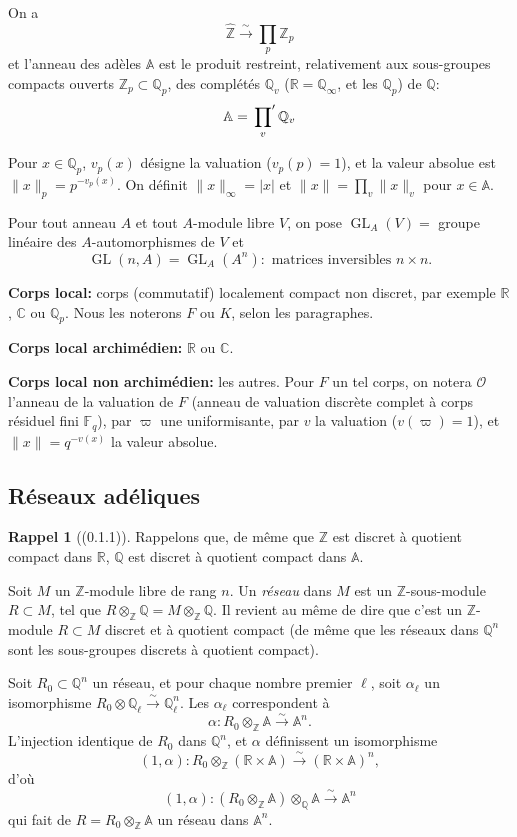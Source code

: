 \documentclass[11pt,a4paper]{amsart}
\theoremstyle{plain}
\theoremstyle{definition}
\newtheorem{rappel}[theorem]{Rappel}
\theoremstyle{remark}
\DeclareMathOperator{\GL}{GL}
\newcommand{\ZZ}{\mathbb{Z}}
\newcommand{\QQ}{\mathbb{Q}}
\newcommand{\RR}{\mathbb{R}}
\newcommand{\CC}{\mathbb{C}}
\newcommand{\Af}{\mathbb{A}}
\newcommand{\Fq}{\mathbb{F}_q}
\newcommand{\cO}{\mathcal{O}}
\newcommand{\wh}{\widehat}
\begin{document}
On a
\[ \wh{\ZZ} \xrightarrow{\sim} \prod_p \ZZ_p \]
et l'anneau des ad\`eles $\Af$ est le produit restreint, relativement aux sous-groupes
compacts ouverts $\ZZ_p \subset \QQ_p$, des compl\'et\'es $\QQ_v$ ($\RR = \QQ_\infty$, et les $\QQ_p$) de $\QQ$:
\[ \Af = \sideset{}{'}\prod_v \QQ_v \]

Pour $x \in \QQ_p$, $v_p(x)$ d\'esigne la valuation ($v_p(p) = 1$), et la valeur absolue est $\|x\|_p = p^{-v_p(x)}$.
On d\'efinit $\|x\|_\infty = |x|$ et $\|x\| = \prod_v \|x\|_v$ pour $x \in \Af$.

Pour tout anneau $A$ et tout $A$-module libre $V$, on pose
$\GL_A(V) = $ groupe lin\'eaire des $A$-automorphismes de $V$ et
\[ \GL(n,A) = \GL_A(A^n) : \text{ matrices inversibles } n \times n. \]

\textbf{Corps local:} corps (commutatif) localement compact non discret, par exemple $\RR$, $\CC$ ou $\QQ_p$. Nous les noterons $F$ ou $K$, selon les paragraphes.

\textbf{Corps local archim\'edien:} $\RR$ ou $\CC$.

\textbf{Corps local non archim\'edien:} les autres. Pour $F$ un tel corps, on notera $\cO$ l'anneau de la valuation de $F$ (anneau de valuation discr\`ete complet \`a corps r\'esiduel fini $\Fq$), par $\varpi$ une uniformisante, par $v$ la valuation ($v(\varpi) = 1$), et $\|x\| = q^{-v(x)}$ la valeur absolue.

\subsection{R\'eseaux ad\'eliques}

\begin{rappel}[(0.1.1)]
Rappelons que, de m\^eme que $\ZZ$ est discret \`a quotient compact dans $\RR$, $\QQ$ est discret \`a quotient compact dans $\Af$.

Soit $M$ un $\ZZ$-module libre de rang $n$. Un \emph{r\'eseau} dans $M$ est un $\ZZ$-sous-module $R \subset M$, tel que $R \otimes_{\ZZ} \QQ = M \otimes_{\ZZ} \QQ$. Il revient au m\^eme de dire que c'est un $\ZZ$-module $R \subset M$ discret et \`a quotient compact (de m\^eme que les r\'eseaux dans $\QQ^n$ sont les sous-groupes discrets \`a quotient compact).

Soit $R_0 \subset \QQ^n$ un r\'eseau, et pour chaque nombre premier $\ell$, soit $\alpha_\ell$ un isomorphisme $R_0 \otimes \QQ_\ell \xrightarrow{\sim} \QQ_\ell^n$. Les $\alpha_\ell$ correspondent \`a
\[ \alpha: R_0 \otimes_{\ZZ} \Af \xrightarrow{\sim} \Af^n. \]
L'injection identique de $R_0$ dans $\QQ^n$, et $\alpha$ d\'efinissent un isomorphisme
\[ (1,\alpha): R_0 \otimes_{\ZZ} (\RR \times \Af) \xrightarrow{\sim} (\RR \times \Af)^n, \]
d'o\`u
\[ (1,\alpha): (R_0 \otimes_{\ZZ} \Af) \otimes_{\QQ} \Af \xrightarrow{\sim} \Af^n \]
qui fait de $R = R_0 \otimes_{\ZZ} \Af$ un r\'eseau dans $\Af^n$.
\end{rappel}
\end{document}
